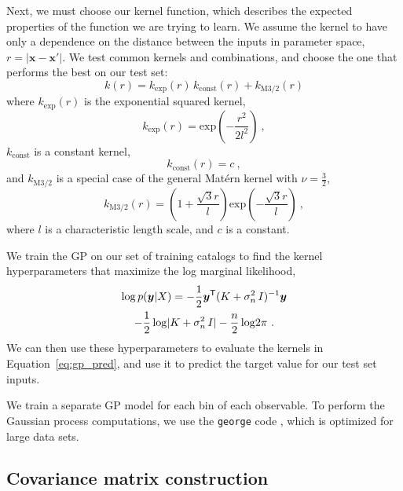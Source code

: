 Next, we must choose our kernel function, which describes the expected properties of the function we are trying to learn.
We assume the kernel to have only a dependence on the distance between the inputs in parameter space, $r = |\bm{x} - \bm{x'}|$. 
We test common kernels and combinations, and choose the one that performs the best on our test set:
\begin{equation}
    k(r) = k_\mathrm{exp}(r)\,k_\mathrm{const}(r) + k_\mathrm{M3/2}(r)
\end{equation}
where $k_\mathrm{exp}(r)$ is the exponential squared kernel,
\begin{equation}
    k_\mathrm{exp}(r) = \mathrm{exp}\left( -\frac{r^2}{2l^2} \right) ~,
\end{equation}
$k_\mathrm{const}$ is a constant kernel,
\begin{equation}
    k_\mathrm{const}(r) = c ~,
\end{equation}
and $k_\mathrm{M3/2}$ is a special case of the general Mat\'ern kernel with $\nu=\frac{3}{2}$,
\begin{equation}
    k_\mathrm{M3/2}(r) = \left( 1 + \frac{\sqrt{3}r}{l} \right) \mathrm{exp}  \left( -\frac{\sqrt{3}r}{l} \right) ~,
\end{equation}
where $l$ is a characteristic length scale, and $c$ is a constant.

We train the GP on our set of training catalogs to find the kernel hyperparameters that maximize the log marginal likelihood,
\begin{multline}
    \mathrm{log}\,p(\bm{y}|X) = -\frac{1}{2} \bm{y}^{\mathsf{T}} (K + \sigma_n^2\,I)^{-1}\bm{y} \\
    - \frac{1}{2} \, \mathrm{log}|K + \sigma_n^2\,I| - \frac{n}{2} \, \mathrm{log}2\pi ~.
\end{multline} 
We can then use these hyperparameters to evaluate the kernels in Equation~\eqref{eq:gp_pred}, and use it to predict the target value for our test set inputs.

We train a separate GP model for each bin of each observable.
To perform the Gaussian process computations, we use the \texttt{george} code \citep{Ambikasaran2016}, which is optimized for large data sets.


\subsection{Covariance matrix construction}
\label{sec:cov}

